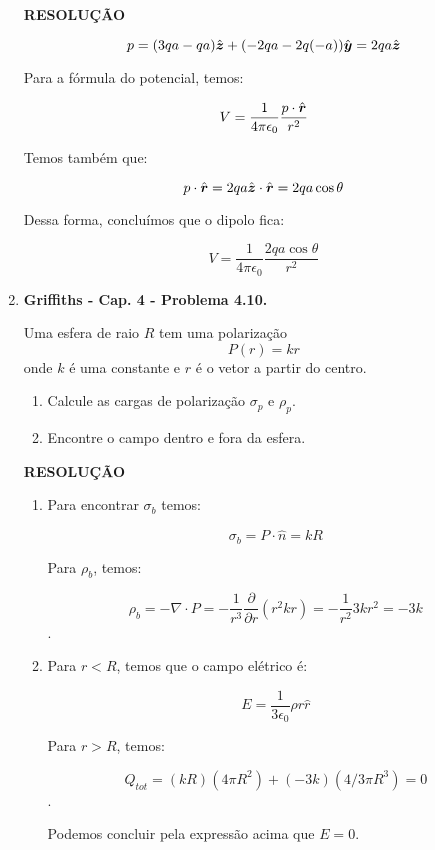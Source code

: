\documentclass[11pt,a4paper]{article}
\newcommand{\mat}[1]{\mbox{\boldmath{$#1$}}}
\begin{document}
\begin{enumerate}
\textbf{RESOLUÇÃO}

$$p = (3qa - qa)\hat{\mat{z}} + (-2qa - 2q(-a))\hat{\mat{y}} = 2qa \hat{\mat{z}}$$

Para a fórmula do potencial, temos:

$$V = \displaystyle\dfrac{1}{4\pi \epsilon_0} \displaystyle\dfrac{p \cdot \hat{\mat{r}}}{r^2}$$

Temos também que:

$$p \cdot \hat{\mat{r}} = 2qa\hat{\mat{z}} \cdot \hat{\mat{r}} = 2qa \cos \theta$$

Dessa forma, concluímos que o dipolo fica:

$$V = \displaystyle\dfrac{1}{4\pi \epsilon_0} \displaystyle\dfrac{2qa \cos \theta}{r^2}$$

\item \textbf{Griffiths - Cap. 4 - Problema 4.10.}

Uma esfera de raio $R$ tem uma polarização
$$P(r) = kr$$
onde $k$ é uma constante e $r$ é o vetor a partir do centro. 

\begin{enumerate}
\item Calcule as cargas de polarização $\sigma_p$ e $\rho_p$.
\item Encontre o campo dentro e fora da esfera.
\end{enumerate}


\textbf{RESOLUÇÃO}

\begin{enumerate}

\item 

Para encontrar $\sigma_b$ temos:

$$\sigma_b = P \cdot \hat{n} = kR$$

Para $\rho_b$, temos:

$$\rho_b = - \nabla \cdot P = -\displaystyle\dfrac{1}{r^3} \displaystyle\dfrac{\partial}{\partial r}(r^2kr) = -\displaystyle\dfrac{1}{r^2} 3kr^2 = -3k$$.


\item

Para $r < R$, temos que o campo elétrico é:

$$E = \displaystyle\dfrac{1}{3\epsilon_0} \rho r \hat{r}$$

Para $r > R$, temos:

$$Q_{tot} = (kR)(4\pi R^2) + (-3k)(4/3\pi R^3) = 0$$. 

Podemos concluir pela expressão acima que $E = 0$.


\end{enumerate}
\end{enumerate}
\end{document}
